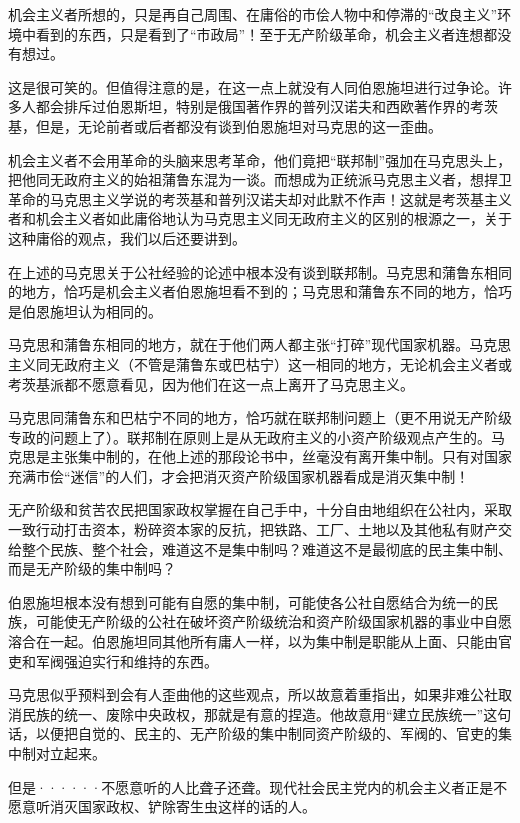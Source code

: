 机会主义者所想的，只是再自己周围、在庸俗的市侩人物中和停滞的“改良主义”环境中看到的东西，只是看到了“市政局”！至于无产阶级革命，机会主义者连想都没有想过。

这是很可笑的。但值得注意的是，在这一点上就没有人同伯恩施坦进行过争论。许多人都会排斥过伯恩斯坦，特别是俄国著作界的普列汉诺夫和西欧著作界的考茨基，但是，无论前者或后者都{\kaishu 没有}谈到伯恩施坦对马克思的{\kaishu 这一}歪曲。

机会主义者不会用革命的头脑来思考革命，他们竟把“联邦制”强加在马克思头上，把他同无政府主义的始祖蒲鲁东混为一谈。而想成为正统派马克思主义者，想捍卫革命的马克思主义学说的考茨基和普列汉诺夫却对此默不作声！这就是考茨基主义者和机会主义者如此庸俗地认为马克思主义同无政府主义的区别的根源之一，关于这种庸俗的观点，我们以后还要讲到。

在上述的马克思关于公社经验的论述中根本没有谈到联邦制。马克思和蒲鲁东相同的地方，恰巧是机会主义者伯恩施坦看不到的；马克思和蒲鲁东不同的地方，恰巧是伯恩施坦认为相同的。

马克思和蒲鲁东相同的地方，就在于他们两人都主张“打碎”现代国家机器。马克思主义同无政府主义（不管是蒲鲁东或巴枯宁）这一相同的地方，无论机会主义者或考茨基派都不愿意看见，因为他们在这一点上离开了马克思主义。

马克思同蒲鲁东和巴枯宁不同的地方，恰巧就在联邦制问题上（更不用说无产阶级专政的问题上了）。联邦制在原则上是从无政府主义的小资产阶级观点产生的。马克思是主张集中制的，在他上述的那段论书中，丝毫没有离开集中制。只有对国家充满市侩“迷信”的人们，才会把消灭资产阶级国家机器看成是消灭集中制！

无产阶级和贫苦农民把国家政权掌握在自己手中，十分自由地组织在公社内，采取{\kaishu 一致}行动打击资本，粉碎资本家的反抗，把铁路、工厂、土地以及其他私有财产交给{\kaishu 整个}民族、整个社会，难道这不是集中制吗？难道这不是最彻底的民主集中制、而是无产阶级的集中制吗？

伯恩施坦根本没有想到可能有自愿的集中制，可能使各公社自愿结合为统一的民族，可能使无产阶级的公社在破坏资产阶级统治和资产阶级国家机器的事业中自愿溶合在一起。伯恩施坦同其他所有庸人一样，以为集中制是职能从上面、只能由官吏和军阀强迫实行和维持的东西。

马克思似乎预料到会有人歪曲他的这些观点，所以故意着重指出，如果非难公社取消民族的统一、废除中央政权，那就是有意的捏造。他故意用“建立民族统一”这句话，以便把自觉的、民主的、无产阶级的集中制同资产阶级的、军阀的、官吏的集中制对立起来。

但是······不愿意听的人比聋子还聋。现代社会民主党内的机会主义者正是不愿意听消灭国家政权、铲除寄生虫这样的话的人。







